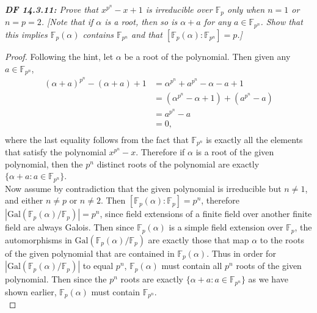 \documentclass{article}
\begin{document}
\it \textbf{DF 14.3.11:} Prove that $x^{p^n}-x+1$ is irreducible over
  $\mathbb{F}_p$ only when $n=1$ or $n=p=2$. [Note that if $\alpha$ is a
  root, then so is $\alpha+a$ for any $a\in\mathbb{F}_{p^n}$. Show that
  this implies $\mathbb{F}_p(\alpha)$ contains $\mathbb{F}_{p^n}$ and that
  $[\mathbb{F}_p(\alpha):\mathbb{F}_{p^n}]=p$.]

  \begin{proof}
    Following the hint, let $\alpha$ be a root of the polynomial. Then
    given any $a\in\mathbb{F}_{p^n}$,
    \begin{align*}
      (\alpha+a)^{p^n}-(\alpha+a)+1 &=\alpha^{p^n}+a^{p^n}-\alpha-a+1\\
      &=(\alpha^{p^n}-\alpha+1)+(a^{p^n}-a)\\
      &=a^{p^n}-a\\
      &=0,\\
    \end{align*}
    where the last equality follows from the fact that $\mathbb{F}_{p^n}$
    is exactly all the elements that satisfy the polynomial $x^{p^n}-x$.
    Therefore if $\alpha$ is a root of the given polynomial, then the $p^n$
    distinct roots of the polynomial are exactly
    $\{\alpha+a:a\in\mathbb{F}_{p^n}\}$. \\

    Now assume by contradiction that the given polynomial is irreducible
    but $n\neq1$, and either $n\neq p$ or $n\neq2$. Then
    $[\mathbb{F}_p(\alpha):\mathbb{F}_p]=p^n$, therefore
    $|\text{Gal}(\mathbb{F}_p(\alpha)/\mathbb{F}_p)|=p^n$, since field
    extensions of a finite field over another finite field are always
    Galois. Then since $\mathbb{F}_p(\alpha)$ is a simple field extension
    over $\mathbb{F}_p$, the automorphisms in
    $\text{Gal}(\mathbb{F}_p(\alpha)/\mathbb{F}_p)$ are exactly those that
    map $\alpha$ to the roots of the given polynomial that are contained in
    $\mathbb{F}_p(\alpha)$. Thus in order for
    $|\text{Gal}(\mathbb{F}_p(\alpha)/\mathbb{F}_p)|$ to equal $p^n$,
    $\mathbb{F}_p(\alpha)$ must contain all $p^n$ roots of the
    given polynomial. Then since the $p^n$ roots are exactly
    $\{\alpha+a:a\in\mathbb{F}_{p^n}\}$ as we have shown earlier,
    $\mathbb{F}_p(\alpha)$ must contain $\mathbb{F}_{p^n}$. \\


\end{proof}
\end{document}
